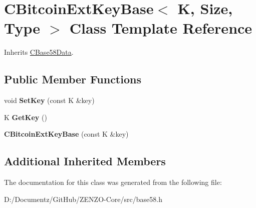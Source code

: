 \hypertarget{class_c_bitcoin_ext_key_base}{}\section{C\+Bitcoin\+Ext\+Key\+Base$<$ K, Size, Type $>$ Class Template Reference}
\label{class_c_bitcoin_ext_key_base}


Inherits \mbox{\hyperlink{class_c_base58_data}{C\+Base58\+Data}}.

\subsection*{Public Member Functions}
\begin{DoxyCompactItemize}
\item 
\mbox{\label{class_c_bitcoin_ext_key_base_aa6041045bb68b3f24d92f5e3b96aeef6}} 
void {\bfseries Set\+Key} (const K \&key)
\item 
\mbox{\label{class_c_bitcoin_ext_key_base_a528399b89529212a44a08250c5f29d68}} 
K {\bfseries Get\+Key} ()
\item 
\mbox{\label{class_c_bitcoin_ext_key_base_a61b09dabc0849ba24520a78c5996096a}} 
{\bfseries C\+Bitcoin\+Ext\+Key\+Base} (const K \&key)
\end{DoxyCompactItemize}
\subsection*{Additional Inherited Members}


The documentation for this class was generated from the following file\+:\begin{DoxyCompactItemize}
\item 
D\+:/\+Documentz/\+Git\+Hub/\+Z\+E\+N\+Z\+O-\/\+Core/src/base58.\+h\end{DoxyCompactItemize}
